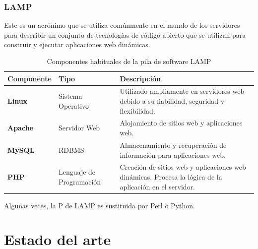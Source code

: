             \newpage


        \subsection{LAMP}

            Este es un acrónimo que se utiliza comúnmente en el mundo de los servidores para describir un conjunto de tecnologías de código abierto que se utilizan para construir y ejecutar aplicaciones web dinámicas.

            \begin{table}[!htbp]
                  \centering
                  
                  \begin{tabular}{|>{\centering\arraybackslash}m{3cm}|>{\centering\arraybackslash}m{3cm}|>{\centering\arraybackslash}m{8cm}|}
                        \hline
                        \textbf{Componente} & \textbf{Tipo} & \textbf{Descripción} \\
                        \hline
                        \hline
                        \textbf{Linux} & Sistema Operativo & Utilizado ampliamente en servidores web debido a su fiabilidad, seguridad y flexibilidad. \\
                        \hline
                        \textbf{Apache} & Servidor Web & Alojamiento de sitios web y aplicaciones web. \\
                        \hline
                        \textbf{MySQL} & RDBMS & Almacenamiento y recuperación de información para aplicaciones web. \\
                        \hline
                        \textbf{PHP} & Lenguaje de Programación & Creación de sitios web y aplicaciones web dinámicas. Procesa la lógica de la aplicación en el servidor. \\
                        \hline
                  \end{tabular}

                  \caption{Componentes habituales de la pila de software LAMP}
                  \label{table:lamp}
            \end{table}
            
            Algunas veces, la P de LAMP es sustituida por Perl o Python.                  

            \cleardoublepage

    
     
\chapter{Estado del arte}

